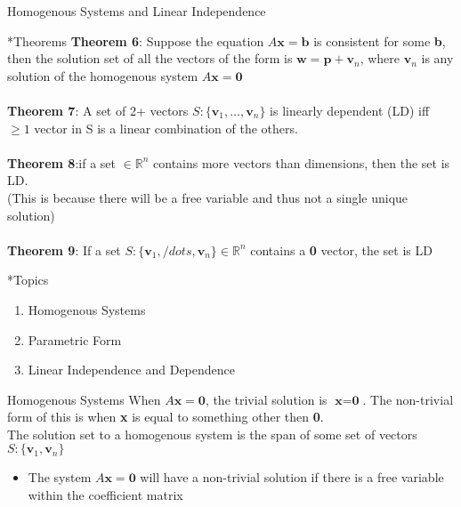 \documentclass[a4paper, 12pt]{article}
\begin{document}
\newpage
\begin{section}{Homogenous Systems and Linear Independence}

\begin{subsection}*{Theorems}
\textbf{Theorem 6}: Suppose the equation $A\textbf{x}=\textbf{b}$ is
consistent for some \textbf{b}, then the solution set of all the 
vectors of the form is $\textbf{w}=\textbf{p}+\textbf{v}_n$, where
$\textbf{v}_n$ is any solution of the homogenous 
system $A\textbf{x}=\textbf{0}$
\\
\\ \textbf{Theorem 7}: A set of 2+ vectors $S:\lbrace\textbf{v}_1,\dots
,\textbf{v}_n\rbrace$ is linearly dependent (LD) iff $\geq 1$ vector 
in S is a linear combination of the others.\\
\\
\textbf{Theorem 8}:if a set $\in\mathbb{R}^n$ contains more vectors 
than dimensions, then the set is LD.\\
(This is because there will be a free variable and thus not a single
unique solution)
\\
\\ \textbf{Theorem 9}: If a set $S:\lbrace\textbf{v}_1,/dots
,\textbf{v}_n\rbrace \in\mathbb{R}^n$ contains a \textbf{0} vector, the
set is LD
\end{subsection}
\begin{subsection}*{Topics}
	\begin{enumerate}
	\item{Homogenous Systems}
	\item{Parametric Form}
	\item{Linear Independence and Dependence}
	\end{enumerate}
\end{subsection}
\begin{subsection}{Homogenous Systems}
When $A\textbf{x}=\textbf{0}$, the trivial solution is
$\textbf{x}=\textbf{0}$. The non-trivial form of this is when
\textbf{x} is equal to something other then \textbf{0}.\\
The solution set to a homogenous system is the span of some set of 
vectors $S:\lbrace\textbf{v}_1,\textbf{v}_n\rbrace$
\begin{itemize}
\item{The system $A\textbf{x}=\textbf{0}$
	will have a non-trivial solution if there is a free
	variable within the coefficient matrix}
\end{itemize}

\end{subsection}


\end{section}
\end{document}
